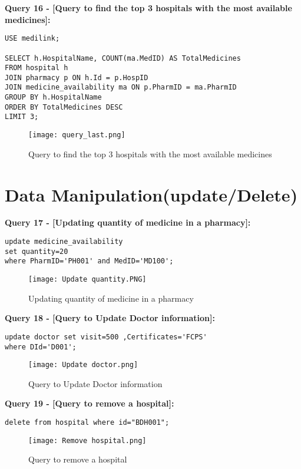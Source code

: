 \documentclass[11pt]{article}
\begin{document}
\textbf{Query 16 - [Query to find the top 3 hospitals with the most available medicines]:}

\begin{lstlisting}
USE medilink;

SELECT h.HospitalName, COUNT(ma.MedID) AS TotalMedicines
FROM hospital h 
JOIN pharmacy p ON h.Id = p.HospID 
JOIN medicine_availability ma ON p.PharmID = ma.PharmID 
GROUP BY h.HospitalName 
ORDER BY TotalMedicines DESC 
LIMIT 3; 
\end{lstlisting}

\begin{figure}[H]
    \centering
    \texttt{[image: query\_last.png]}
    \caption{Query to find the top 3 hospitals with the most available medicines}
    \label{fig:1}
\end{figure}


\section{Data Manipulation(update/Delete)}
\textbf{Query 17 - [Updating quantity of medicine in a pharmacy]:}

\begin{lstlisting}
update medicine_availability 
set quantity=20 
where PharmID='PH001' and MedID='MD100'; 
\end{lstlisting}

\begin{figure}[H]
    \centering
    \texttt{[image: Update quantity.PNG]}
    \caption{Updating quantity of medicine in a pharmacy}
    \label{fig:1}
\end{figure}

\textbf{Query 18 - [Query to Update Doctor information]:}

\begin{lstlisting}
update doctor set visit=500 ,Certificates='FCPS'
where DId='D001';
\end{lstlisting}

\begin{figure}[H]
    \centering
    \texttt{[image: Update doctor.png]}
    \caption{Query to Update Doctor information}
    \label{fig:1}
\end{figure}

\textbf{Query 19 - [Query to remove a hospital]:}
\begin{lstlisting}
delete from hospital where id="BDH001";
\end{lstlisting}
\begin{figure}[H]
    \centering
    \texttt{[image: Remove hospital.png]}
    \caption{Query to remove a hospital}
    \label{fig:1}
\end{figure}
\end{document}
